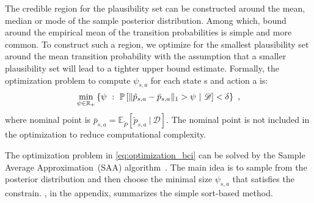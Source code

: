 \documentclass{article}
\DeclarePairedDelimiter{\norm}{\lVert}{\rVert}
\newcommand{\E}{\mathbb{E}}
\renewcommand{\P}{\mathbb{P}}
\newcommand{\Real}{\mathbb{R}}
\renewcommand{\ss}{~:~}
\theoremstyle{plain}
\theoremstyle{definition}
\begin{document}
The credible region for the plausibility set can be constructed around the mean, median or mode of the sample posterior distribution. Among which, bound around the empirical mean of the transition probabilities is simple and more common. To construct such a region, we optimize for the smallest plausibility set around the mean transition
probability with the assumption that a smaller plausibility set will lead to a tighter upper bound estimate.
Formally, the optimization problem to compute $\psi_{s,a}$ for each state s and action a is:
\begin{equation} \label{eq:optimization_bci}
\min_{\psi\in\Real_+} \left\{\psi \ss \P\left[ \norm{\tilde{p}_{s,a} - \bar{p}_{s,a}}_1 > \psi ~|~ \mathcal{D} \right] < \delta \right\}~,
\end{equation}
where nominal point is $\bar{p}_{s,a} = \E_{\tilde{P}}[\tilde{p}_{s,a} ~|~ \mathcal{D}]$. The nominal point is not included in the optimization to reduce computational complexity. 

The optimization problem in \cref{eq:optimization_bci} can be solved by the Sample Average Approximation~(SAA) algorithm~\citep{Shapiro2014}. The main idea is to sample from the posterior distribution and then choose the minimal size $\psi_{s,a}$ that satisfies the constrain.  , in the appendix, summarizes the simple sort-based method.
\end{document}

